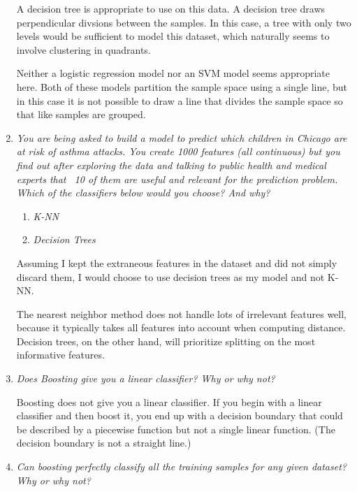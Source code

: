 \documentclass{article}
\begin{document}
\begin{enumerate}
        A decision tree is appropriate to use on this data. A decision tree
        draws perpendicular divsions between the samples. In this case, a tree
        with only two levels would be sufficient to model this dataset, which
        naturally seems to involve clustering in quadrants.

        Neither a logistic regression model nor an SVM model seems appropriate
        here. Both of these models partition the sample space using a single
        line, but in this case it is not possible to draw a line that divides
        the sample space so that like samples are grouped.

    \item \textit{You are being asked to build a model to predict which
        children in Chicago are at risk of asthma attacks. You create 1000
        features (all continuous) but you find out after exploring the data and
        talking to public health and medical experts that ~10 of them are
        useful and relevant for the prediction problem. Which of the
        classifiers below would you choose? And why?}

        \begin{enumerate}
            \item \textit{K-NN}
            \item \textit{Decision Trees}
        \end{enumerate}

        Assuming I kept the extraneous features in the dataset and did not
        simply discard them, I would choose to use decision trees as my model
        and not K-NN.

        The nearest neighbor method does not handle lots of irrelevant features
        well, because it typically takes all features into account when
        computing distance. Decision trees, on the other hand, will prioritize
        splitting on the most informative features.

    \item \textit{Does Boosting give you a linear classifier? Why or why not?}

        Boosting does not give you a linear classifier. If you begin with a
        linear classifier and then boost it, you end up with a decision
        boundary that could be described by a piecewise function but not a
        single linear function. (The decision boundary is not a straight line.)

    \item \textit{Can boosting perfectly classify all the training samples for
        any given dataset? Why or why not?}


\end{enumerate}
\end{document}
